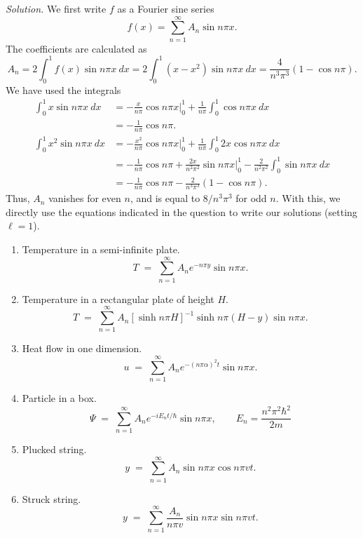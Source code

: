 \documentclass[10pt]{article}
\begin{document}
        \textit{Solution.} We first write $f$ as a Fourier sine series
        \[
                f(x) = \sum_{n = 1}^\infty A_n\sin{n\pi x}.
        \]
        The coefficients are calculated as
        \[
                A_n = 2\int_0^1 f(x)\sin{n\pi x}\: dx = 2\int_0^1 (x - x^2)\sin{n\pi x}\:dx = \frac{4}{n^3\pi^3}(1 - \cos{n\pi}).
        \]
        We have used the integrals
        \begin{align*}
                \int_0^1 x\sin{n\pi x}\: dx &=  -\frac{x}{n\pi}\cos{n\pi x}\Big|_0^1 + \frac{1}{n\pi}\int_0^1 \cos{n\pi x}\: dx \\
                        &= -\frac{1}{n\pi}\cos{n\pi}. \\
                \int_0^1 x^2\sin{n\pi x}\:dx &= -\frac{x^2}{n\pi}\cos{n\pi x}\Big|_0^1 + \frac{1}{n\pi}\int_0^1 2x\cos{n\pi x}\:dx \\
                        &= -\frac{1}{n\pi}\cos{n\pi} + \frac{2x}{n^2\pi^2}\sin{n\pi x}\Big|_0^1 - \frac{2}{n^2\pi^2}\int_0^1 \sin{n\pi x}\: dx \\
                        &= -\frac{1}{n\pi}\cos{n\pi} - \frac{2}{n^3\pi^3}(1 - \cos{n\pi}).
        \end{align*}    
        Thus, $A_{n}$ vanishes for even $n$, and is equal to $8 /n^3\pi^3$ for odd $n$. With this, we directly use the equations
        indicated in the question to write our solutions (setting $\ell = 1$).
        \begin{enumerate}
                \item Temperature in a semi-infinite plate.
                \[
                        T \;=\; \sum_{n = 1}^\infty A_n e^{-n\pi y}\sin{n\pi x}. \tag{Eq 2.9}
                \]
                \item Temperature in a rectangular plate of height $H$.
                \[
                        T \;=\; \sum_{n = 1}^\infty A_n \left[\sinh{n\pi H}\right]^{-1}\sinh{n\pi (H - y)}\sin{n\pi x}. \tag{Eq 2.15}
                \]
                \item Heat flow in one dimension.
                \[
                        u \;=\; \sum_{n = 1}^\infty A_n e^{-(n\pi\alpha)^2 t}\sin{n\pi x}. \tag{Eq 3.12}
                \]
                \item Particle in a box.
                \[
                        \Psi \;=\; \sum_{n = 1}^\infty A_n e^{-iE_n t/\hbar}\sin{n\pi x},\qquad E_n = \frac{n^2\pi^2\hbar^2}{2m} \tag{Eq 3.26}
                \]
                \item Plucked string.
                \[
                        y \;=\; \sum_{n = 1}^\infty A_n \sin{n\pi x}\cos{n\pi vt}. \tag{Eq 4.7}
                \]
                \item Struck string.
                \[
                        y \;=\; \sum_{n = 1}^\infty \frac{A_n}{n\pi v} \sin{n\pi x}\sin{n\pi vt}. \tag{Eq 4.10}
                \]
        \end{enumerate}
\end{document}
